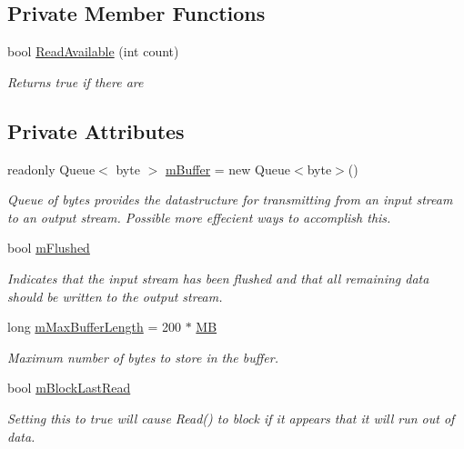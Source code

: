 \subsection*{Private Member Functions}
\begin{DoxyCompactItemize}
\item 
bool \mbox{\hyperlink{class_a_d_l_1_1_pipe_stream_a82add2a351991d0f3580d4a198f44675}{Read\+Available}} (int count)
\begin{DoxyCompactList}\small\item\em Returns true if there are \end{DoxyCompactList}\end{DoxyCompactItemize}
\subsection*{Private Attributes}
\begin{DoxyCompactItemize}
\item 
readonly Queue$<$ byte $>$ \mbox{\hyperlink{class_a_d_l_1_1_pipe_stream_ac3ea3e53b1c4a1344a6a9618a67751df}{m\+Buffer}} = new Queue$<$byte$>$()
\begin{DoxyCompactList}\small\item\em Queue of bytes provides the datastructure for transmitting from an input stream to an output stream. Possible more effecient ways to accomplish this. \end{DoxyCompactList}\item 
bool \mbox{\hyperlink{class_a_d_l_1_1_pipe_stream_a186ff66fbf297d1491d7ca528326c3da}{m\+Flushed}}
\begin{DoxyCompactList}\small\item\em Indicates that the input stream has been flushed and that all remaining data should be written to the output stream. \end{DoxyCompactList}\item 
long \mbox{\hyperlink{class_a_d_l_1_1_pipe_stream_af8cc7772cf7ae02b1890ab8c58d0cbad}{m\+Max\+Buffer\+Length}} = 200 $\ast$ \mbox{\hyperlink{class_a_d_l_1_1_pipe_stream_ad4a04360b3d017567a0fd48defd434d0}{MB}}
\begin{DoxyCompactList}\small\item\em Maximum number of bytes to store in the buffer. \end{DoxyCompactList}\item 
bool \mbox{\hyperlink{class_a_d_l_1_1_pipe_stream_a1dd964eae6da39ffb26d8bb1ff8ffaa7}{m\+Block\+Last\+Read}}
\begin{DoxyCompactList}\small\item\em Setting this to true will cause Read() to block if it appears that it will run out of data. \end{DoxyCompactList}\end{DoxyCompactItemize}


